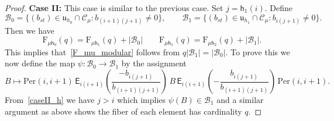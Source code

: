 \documentclass[10pt,a4paper]{amsart}
\newcommand{\EE}{\mathsf{E}}
\newcommand{\F}{\mathrm{F}}
\newcommand{\hes}{\mathsf{h}}
\renewcommand{\u}{\mathfrak{u}}
\begin{document}
\begin{proof}
 
\medskip

{\noindent \bf Case II:} This case is similar to the previous case. Set $j=\hes_1(i)$. Define 
$$
\mathcal{B}_0=\{(b_{st})\in \u_{h_0}\cap\mathcal{C}_\mu: b_{(i+1)(j+1)}\neq 0\},\qquad \mathcal{B}_1=\{(b_{st})\in \u_{h_1}\cap\mathcal{C}_\mu: b_{i(j+1)}\neq 0\}.
$$
Then we have 
$$
\F_{\mu\hes_0}(q)=\F_{\mu\hes_1}(q)+|\mathcal{B}_0|\qquad
\F_{\mu\hes_1}(q)=\F_{\mu\hes_2}(q)+|\mathcal{B}_1|. 
$$
This implies that~\cref{F_mu_modular} follows from $q|\mathcal{B}_1|=|\mathcal{B}_0|$. To prove this we now define
the map 
$\psi: \mathcal{B}_0\to \mathcal{B}_1
$
by the assignment  
$$
B\mapsto \mathrm{Per}(i,i+1)\,\EE_{i(i+1)}\left(\frac{-b_{i(j+1)}}{b_{(i+1)(j+1)}}\right)\,B\,\EE_{i(i+1)}\left(-\frac{b_{i(j+1)}}{b_{(i+1)(j+1)}}\right)\,\mathrm{Per}(i,i+1).
$$
From~\cref{caseII_h} we have $j>i$ which implies $\psi(B)\in \mathcal{B}_1$ and a similar argument as above shows the fiber of each element has cardinality $q$. 
\end{proof}
\end{document}
